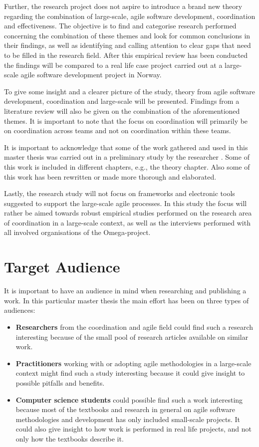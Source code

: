 Further, the research project does not aspire to introduce a brand new theory regarding the combination of large-scale, agile software development, coordination and effectiveness. The objective is to find and categorise research performed concerning the combination of these themes and look for common conclusions in their findings, as well as identifying and calling attention to clear gaps that need to be filled in the research field. After this empirical review has been conducted the findings will be compared to a real life case project carried out at a large-scale agile software development project in Norway.

To give some insight and a clearer picture of the study, theory from agile software development, coordination and large-scale will be presented. Findings from a literature review will also be given on the combination of the aforementioned themes. It is important to note that the focus on coordination will primarily be on coordination across teams and not on coordination within these teams.

It is important to acknowledge that some of the work gathered and used in this master thesis was carried out in a preliminary study by the researcher \cite{Andreassen2014}. Some of this work is included in different chapters, e.g., the theory chapter. Also some of this work has been rewritten or made more thorough and elaborated.

Lastly, the research study will not focus on frameworks and electronic tools suggested to support the large-scale agile processes. In this study the focus will rather be aimed towards robust empirical studies performed on the research area of coordination in a large-scale context, as well as the interviews performed with all involved organisations of the Omega-project.

\section{Target Audience}

It is important to have an audience in mind when researching and publishing a work. In this particular master thesis the main effort has been on three types of audiences:

\begin{itemize}
   \item \textbf{Researchers} from the coordination and agile field could find such a research interesting because of the small pool of research articles available on similar work.
   \item \textbf{Practitioners} working with or adopting agile methodologies in a large-scale context might find such a study interesting because it could give insight to possible pitfalls and benefits.
   \item \textbf{Computer science students} could possible find such a work interesting because most of the textbooks and research in general on agile software methodologies and development has only included small-scale projects. It could also give insight to how work is performed in real life projects, and not only how the textbooks describe it.
\end{itemize}

